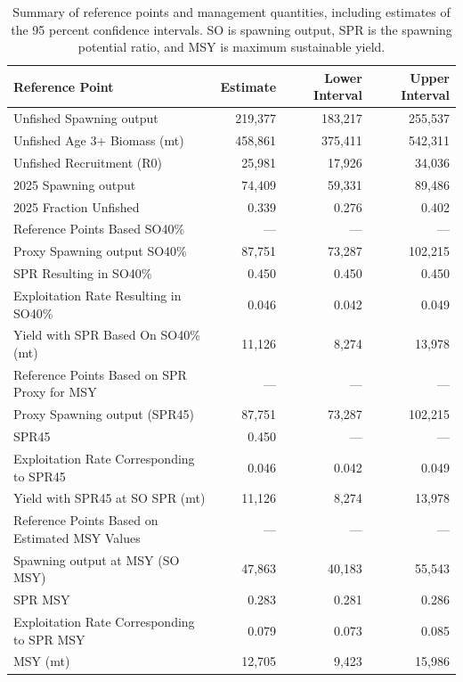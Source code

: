 \documentclass[
  english,
]{article}
\begin{document}
\begin{longtable}{lrrr}

\caption{\label{tbl-ref-points}Summary of reference points and
management quantities, including estimates of the 95 percent confidence
intervals. SO is spawning output, SPR is the spawning potential ratio,
and MSY is maximum sustainable yield.}

\tabularnewline

\toprule
Reference Point & Estimate & Lower Interval & Upper Interval \\ 
\midrule\addlinespace[2.5pt]
Unfished Spawning output & 219,377 & 183,217 & 255,537 \\ 
Unfished Age 3+ Biomass (mt) & 458,861 & 375,411 & 542,311 \\ 
Unfished Recruitment (R0) & 25,981 & 17,926 & 34,036 \\ 
2025 Spawning output & 74,409 & 59,331 & 89,486 \\ 
2025 Fraction Unfished & 0.339 & 0.276 & 0.402 \\ 
Reference Points Based SO40\% & — & — & — \\ 
Proxy Spawning output SO40\% & 87,751 & 73,287 & 102,215 \\ 
SPR Resulting in SO40\% & 0.450 & 0.450 & 0.450 \\ 
Exploitation Rate Resulting in SO40\% & 0.046 & 0.042 & 0.049 \\ 
Yield with SPR Based On SO40\% (mt) & 11,126 & 8,274 & 13,978 \\ 
Reference Points Based on SPR Proxy for MSY & — & — & — \\ 
Proxy Spawning output (SPR45) & 87,751 & 73,287 & 102,215 \\ 
SPR45 & 0.450 & — & — \\ 
Exploitation Rate Corresponding to SPR45 & 0.046 & 0.042 & 0.049 \\ 
Yield with SPR45 at SO SPR (mt) & 11,126 & 8,274 & 13,978 \\ 
Reference Points Based on Estimated MSY Values & — & — & — \\ 
Spawning output at MSY (SO MSY) & 47,863 & 40,183 & 55,543 \\ 
SPR MSY & 0.283 & 0.281 & 0.286 \\ 
Exploitation Rate Corresponding to SPR MSY & 0.079 & 0.073 & 0.085 \\ 
MSY (mt) & 12,705 & 9,423 & 15,986 \\ 
\bottomrule

\end{longtable}
\end{document}
